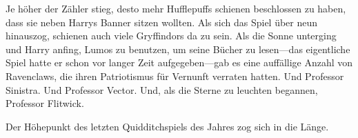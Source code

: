 




Je höher der Zähler stieg, desto mehr Hufflepuffs schienen beschlossen zu haben, dass sie neben Harrys Banner sitzen wollten. Als sich das Spiel über neun hinauszog, schienen auch viele Gryffindors da zu sein. Als die Sonne unterging und Harry anfing, Lumos zu benutzen, um seine Bücher zu lesen—das eigentliche Spiel hatte er schon vor langer Zeit aufgegeben—gab es eine auffällige Anzahl von Ravenclaws, die ihren Patriotismus für Vernunft verraten hatten. Und Professor Sinistra. Und Professor Vector. Und, als die Sterne zu leuchten begannen, Professor Flitwick.

Der Höhepunkt des letzten Quidditchspiels des Jahres zog sich in die Länge.

\later

